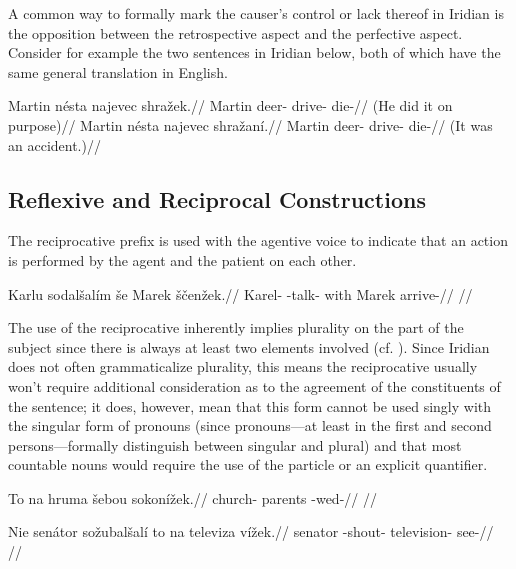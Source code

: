 A common way to formally mark the causer's control or lack thereof in Iridian is the opposition between the retrospective aspect and the perfective aspect. Consider for example the two sentences in Iridian below, both of which have the same general translation in English.

\pex
\a
\begingl
	\gla Martin n\'esta najevec shra\v{z}ek.//
	\glb Martin deer- drive- die-//
	\glft {} (He did it on purpose)//
\endgl
\a
\begingl
	\gla Martin n\'esta najevec shra\v{z}an\'i.//
	\glb Martin deer- drive- die-//
	\glft {} (It was an accident.)//
\endgl
\xe

\subsection{Reflexive and Reciprocal Constructions}

The reciprocative prefix  is used with the agentive voice to indicate that an action is performed by the agent and the patient on each other.

\pex
\begingl
\gla Karlu sodal\v{s}al\'im \v{s}e Marek \v{s}\v{c}en\v{z}ek.//
\glb Karel- -talk- with Marek arrive-//
\glft {}//
\endgl
\xe

The use of the reciprocative inherently implies plurality on the part of the subject since there is always at least two elements involved (cf. \cite[255]{tesniere1965}). Since Iridian does not often grammaticalize plurality, this means the reciprocative usually won't require additional consideration as to the agreement of the constituents of the sentence; it does, however, mean that this form cannot be used singly with the singular form of pronouns (since pronouns---at least in the first and second persons---formally distinguish between singular and plural) and that most countable nouns would require the use of the particle  or an explicit quantifier.

\pex
\begingl
\gla To na hruma \v{s}ebou sokon\'i\v{z}ek.//
\glb {}  church- parents -wed-//
\glft {}//
\endgl
\xe

\pex
\begingl
\gla Nie sen\'ator so\v{z}ubal\v{s}al\'i to na televiza v\'i\v{z}ek.//
\glb {} senator -shout-   television- see-//
\glft {}//
\endgl
\xe

